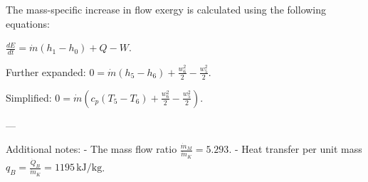 The mass-specific increase in flow exergy is calculated using the following equations:  

\( \frac{dE}{dt} = \dot{m} \left( h_1 - h_0 \right) + Q - W \).  

Further expanded:  
\( 0 = \dot{m} \left( h_5 - h_6 \right) + \frac{w_6^2}{2} - \frac{w_5^2}{2} \).  

Simplified:  
\( 0 = \dot{m} \left( c_p \left( T_5 - T_6 \right) + \frac{w_6^2}{2} - \frac{w_5^2}{2} \right) \).  

---

Additional notes:  
- The mass flow ratio \( \frac{\dot{m}_M}{\dot{m}_K} = 5.293 \).  
- Heat transfer per unit mass \( q_B = \frac{\dot{Q}_B}{\dot{m}_K} = 1195 \, \text{kJ/kg} \).